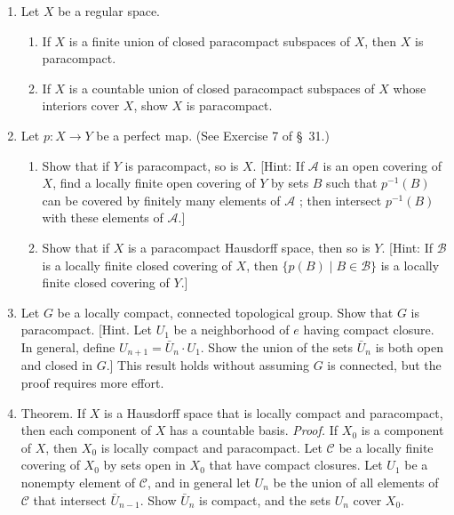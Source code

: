 \begin{enumerate}[itemsep=0.4em, parsep=0pt, topsep=0pt, partopsep=0pt, leftmargin=*, label=\arabic*., ref=\arabic*]
\begin{enumerate}[itemsep=0.2em, parsep=0pt, topsep=0pt, partopsep=0pt, leftmargin=*, label=(\alph*), align=left]
 \item Show \(\mathbb{R}^{\infty }\) is paracompact as a subspace of \(\mathbb{R}^{\omega }\) in the box topology.
 \end{enumerate}
\item[*7.] Let \(X\) be a regular space.
 \begin{enumerate}[itemsep=0.2em, parsep=0pt, topsep=0pt, partopsep=0pt, leftmargin=*, label=(\alph*), align=left]
 \item If \(X\) is a finite union of closed paracompact subspaces of \(X\), then \(X\) is paracompact.
 \item If \(X\) is a countable union of closed paracompact subspaces of \(X\) whose interiors cover \(X\), show \(X\) is paracompact.
 \end{enumerate}
\item[8.] Let \(p : X \rightarrow Y\) be a perfect map. (See Exercise 7 of \S\ 31.)
 \begin{enumerate}[itemsep=0.2em, parsep=0pt, topsep=0pt, partopsep=0pt, leftmargin=*, label=(\alph*), align=left]
 \item Show that if \(Y\) is paracompact, so is \(X\). [Hint: If \(\mathcal{A}\) is an open covering of \(X\), find a locally finite open covering of \(Y\) by sets \(B\) such that \(p^{-1}(B)\) can be covered by finitely many elements of \(\mathcal{A}\) ; then intersect \(p^{-1}(B)\) with these elements of \(\mathcal{A}\).]
 \item Show that if \(X\) is a paracompact Hausdorff space, then so is \(Y\). [Hint: If \(\mathcal{B}\) is a locally finite closed covering of \(X\), then \(\{ p(B) \mid B \in \mathcal{B}\}\) is a locally finite closed covering of \(Y\).]
 \end{enumerate}
\item[9.] Let \(G\) be a locally compact, connected topological group. Show that \(G\) is paracompact. [Hint. Let \(U_{1}\) be a neighborhood of \(e\) having compact closure. In general, define \(U_{n + 1} = \bar{U}_{n} \cdot {U}_{1}\). Show the union of the sets \(\bar{U}_{n}\) is both open and closed in \(G\).] This result holds without assuming \(G\) is connected, but the proof requires more effort.
\item[10.] Theorem. If \(X\) is a Hausdorff space that is locally compact and paracompact, then each component of \(X\) has a countable basis. \textsl{Proof.} If \(X_{0}\) is a component of \(X\), then \(X_{0}\) is locally compact and paracompact. Let \(\mathcal{C}\) be a locally finite covering of \(X_{0}\) by sets open in \(X_{0}\) that have compact closures. Let \(U_{1}\) be a nonempty element of \(\mathcal{C}\), and in general let \(U_{n}\) be the union of all elements of \(\mathcal{C}\) that intersect \(\bar{U}_{n - 1}\). Show \(\bar{U}_{n}\) is compact, and the sets \(U_{n}\) cover \(X_{0}\). 
\end{enumerate}

